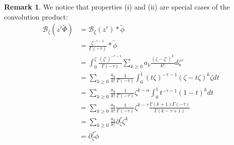 \documentclass{article}
\theoremstyle{definition}
\newcommand{\borel}{\mathcal{B}}
\newtheorem{remark}[definition]{Remark}
\theoremstyle{plain}
\begin{document}
\begin{remark}
We notice that properties (i) and (ii) are special cases of the convolution product:
\begin{align*}
\borel_\zeta (z^\tau \tilde{\Phi})&=\borel_\zeta (z^\tau)\ast \tilde{\phi}\\
&=\frac{\zeta^{-\tau-1}}{\Gamma(-\tau)}\ast\tilde{\phi}\\
&=\int_0^\zeta \frac{(\zeta')^{-\tau-1}}{\Gamma(-\tau)}\sum_{k\geq 0}a_k\frac{(\zeta-\zeta')^k}{k!}d\zeta'\\
&=\sum_{k\geq 0}\frac{a_k}{k!}\frac{1}{\Gamma(-\tau)}\int_0^1(t\zeta)^{-\tau-1}(\zeta-t\zeta)^k\zeta dt\\
&=\sum_{k\geq 0}\frac{a_k}{k!}\frac{1}{\Gamma(-\tau)}\zeta^{k-\alpha}\int_0^1 t^{-\tau-1}(1-t)^k dt\\
&=\sum_{k\geq 0}\frac{a_k}{k!}\frac{1}{\Gamma(-\tau)}\zeta^{k-\tau}\frac{\Gamma(k+1)\Gamma(-\tau)}{\Gamma(k-\tau+1)}\\
&=\sum_{k\geq 0}\frac{a_k}{k!}\partial_\zeta^{\tau} \zeta^k \\
&=\partial_\zeta^\tau\tilde{\phi}
\end{align*}
\end{remark}
\end{document}
